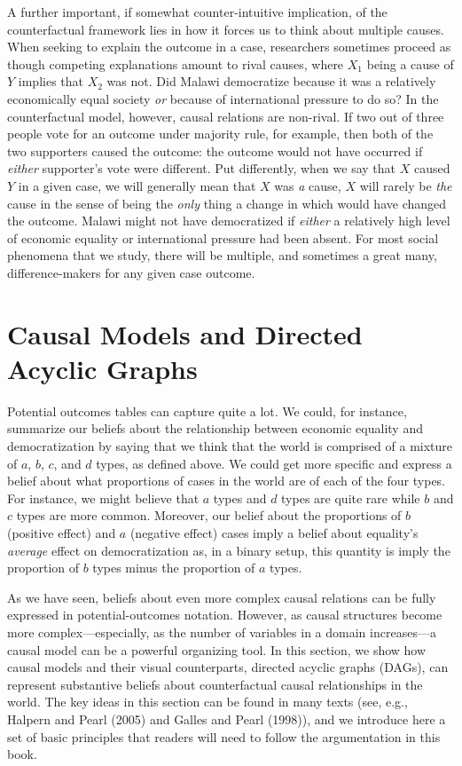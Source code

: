 \documentclass[12pt,]{book}
\begin{document}
A further important, if somewhat counter-intuitive implication, of the counterfactual framework lies in how it forces us to think about multiple causes. When seeking to explain the outcome in a case, researchers sometimes proceed as though competing explanations amount to rival causes, where \(X_1\) being a cause of \(Y\) implies that \(X_2\) was not. Did Malawi democratize because it was a relatively economically equal society \emph{or} because of international pressure to do so? In the counterfactual model, however, causal relations are non-rival. If two out of three people vote for an outcome under majority rule, for example, then both of the two supporters caused the outcome: the outcome would not have occurred if \emph{either} supporter's vote were different. Put differently, when we say that \(X\) caused \(Y\) in a given case, we will generally mean that \(X\) was \emph{a} cause, \(X\) will rarely be \emph{the} cause in the sense of being the \emph{only} thing a change in which would have changed the outcome. Malawi might not have democratized if \emph{either} a relatively high level of economic equality or international pressure had been absent. For most social phenomena that we study, there will be multiple, and sometimes a great many, difference-makers for any given case outcome.

\hypertarget{causal-models-and-directed-acyclic-graphs}{%
\section{Causal Models and Directed Acyclic Graphs}\label{causal-models-and-directed-acyclic-graphs}}

Potential outcomes tables can capture quite a lot. We could, for instance, summarize our beliefs about the relationship between economic equality and democratization by saying that we think that the world is comprised of a mixture of \(a\), \(b\), \(c\), and \(d\) types, as defined above. We could get more specific and express a belief about what proportions of cases in the world are of each of the four types. For instance, we might believe that \(a\) types and \(d\) types are quite rare while \(b\) and \(c\) types are more common. Moreover, our belief about the proportions of \(b\) (positive effect) and \(a\) (negative effect) cases imply a belief about equality's \emph{average} effect on democratization as, in a binary setup, this quantity is imply the proportion of \(b\) types minus the proportion of \(a\) types.

As we have seen, beliefs about even more complex causal relations can be fully expressed in potential-outcomes notation. However, as causal structures become more complex---especially, as the number of variables in a domain increases---a causal model can be a powerful organizing tool. In this section, we show how causal models and their visual counterparts, directed acyclic graphs (DAGs), can represent substantive beliefs about counterfactual causal relationships in the world. The key ideas in this section can be found in many texts (see, e.g., Halpern and Pearl (2005) and Galles and Pearl (1998)), and we introduce here a set of basic principles that readers will need to follow the argumentation in this book.
\end{document}

